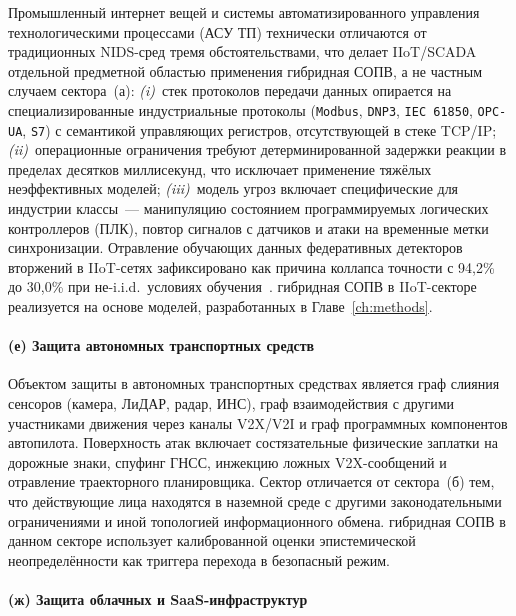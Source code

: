 Промышленный интернет вещей и системы автоматизированного управления
технологическими процессами (АСУ ТП) технически отличаются от
традиционных NIDS-сред тремя обстоятельствами, что делает
IIoT/SCADA отдельной предметной областью применения гибридная СОПВ, а
не частным случаем сектора~(а):
\emph{(i)}~стек протоколов передачи данных опирается на
специализированные индустриальные протоколы (\texttt{Modbus},
\texttt{DNP3}, \texttt{IEC~61850}, \texttt{OPC-UA}, \texttt{S7}) с
семантикой управляющих регистров, отсутствующей в стеке TCP/IP;
\emph{(ii)}~операционные ограничения требуют детерминированной
задержки реакции в пределах десятков миллисекунд, что исключает
применение тяжёлых неэффективных моделей;
\emph{(iii)}~модель угроз включает специфические для индустрии классы~---
манипуляцию состоянием программируемых логических контроллеров
(ПЛК), повтор сигналов с датчиков и атаки на временные метки
синхронизации. Отравление обучающих данных федеративных детекторов
вторжений в IIoT-сетях зафиксировано как причина коллапса точности
с 94{,}2\% до 30{,}0\% при не-i.i.d.\ условиях
обучения~\cite{FerragPoisoning2023}. гибридная СОПВ в IIoT-секторе
реализуется на основе моделей, разработанных в Главе~\ref{ch:methods}.

\paragraph{(е) Защита автономных транспортных средств}\label{subsubsec:sector_av}

Объектом защиты в автономных транспортных средствах является граф
слияния сенсоров (камера, ЛиДАР, радар, ИНС), граф взаимодействия
с другими участниками движения через каналы V2X/V2I и граф
программных компонентов автопилота. Поверхность атак включает
состязательные физические заплатки на дорожные знаки, спуфинг
ГНСС, инжекцию ложных V2X-сообщений и отравление траекторного
планировщика. Сектор отличается от сектора~(б) тем, что
действующие лица находятся в наземной среде с другими
законодательными ограничениями и иной топологией информационного
обмена. гибридная СОПВ в данном секторе использует калиброванной оценки эпистемической неопределённости как
триггера перехода в безопасный режим.

\paragraph{(ж) Защита облачных и SaaS-инфраструктур}\label{subsubsec:sector_cloud}

